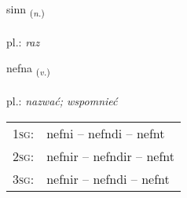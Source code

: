 \documentclass[frontgrid, backgrid]{flacards}\usepackage[]{graphicx}\usepackage[]{xcolor}
\begin{document}
\renewcommand{\flhead}{\vskip5pt \fboxsep=0pt {\small\bfseries\footnotesize Nafnorð | rzeczownik}}
\renewcommand{\fcfoot}{\vskip5pt \fboxsep=0pt \hspace{2pt}{\small\bfseries\footnotesize 1K}}

\renewcommand{\blhead}{\vskip5pt {\small\bfseries\footnotesize Nafnorð | rzeczownik }}
\renewcommand{\bcfoot}{\vskip5pt \hspace{2pt}{\small\bfseries\footnotesize 1K}}


{sinn \small{\textsubscript{(\textit{n.})}} \\[1ex] %
\textphonetic{[sɪn]} \\
pl.: \emph{raz} \\  [2ex]
\renewcommand*{\arraystretch}{0.8}
}

\renewcommand{\flhead}{\vskip5pt \fboxsep=0pt {\small\bfseries\footnotesize Sagnorð | czasownik}}
\renewcommand{\fcfoot}{\vskip5pt \fboxsep=0pt \hspace{2pt}{\small\bfseries\footnotesize 1K}}

\renewcommand{\blhead}{\vskip5pt {\small\bfseries\footnotesize Sagnorð | czasownik }}
\renewcommand{\bcfoot}{\vskip5pt \hspace{2pt}{\small\bfseries\footnotesize 1K}}


{nefna \small{\textsubscript{(\textit{v.})}} \\[1ex] %
\textphonetic{[nɛpna]} \\
pl.: \emph{nazwać; wspomnieć} \\  [2ex]
\renewcommand*{\arraystretch}{0.8}
\begin{tabular}{p{1cm}l}
\textsc{1sg}: & nefni -- nefndi -- nefnt \\ 
\textsc{2sg}: & nefnir -- nefndir -- nefnt \\ 
\textsc{3sg}: & nefnir -- nefndi -- nefnt \\ 
\end{tabular}
}
\end{document}
